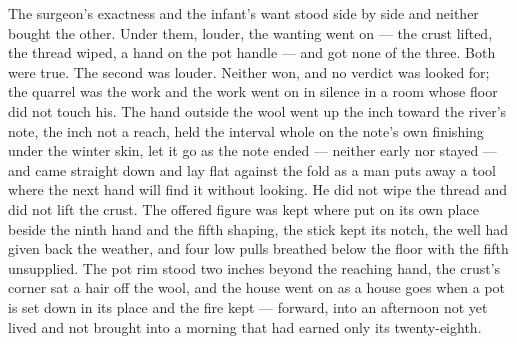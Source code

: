 The surgeon's exactness and the infant's want stood side by side and neither bought the other. Under them, louder, the wanting went on --- the crust lifted, the thread wiped, a hand on the pot handle --- and got none of the three. Both were true. The second was louder. Neither won, and no verdict was looked for; the quarrel was the work and the work went on in silence in a room whose floor did not touch his. The hand outside the wool went up the inch toward the river's note, the inch not a reach, held the interval whole on the note's own finishing under the winter skin, let it go as the note ended --- neither early nor stayed --- and came straight down and lay flat against the fold as a man puts away a tool where the next hand will find it without looking. He did not wipe the thread and did not lift the crust. The offered figure was kept where put on its own place beside the ninth hand and the fifth shaping, the stick kept its notch, the well had given back the weather, and four low pulls breathed below the floor with the fifth unsupplied. The pot rim stood two inches beyond the reaching hand, the crust's corner sat a hair off the wool, and the house went on as a house goes when a pot is set down in its place and the fire kept --- forward, into an afternoon not yet lived and not brought into a morning that had earned only its twenty-eighth.

